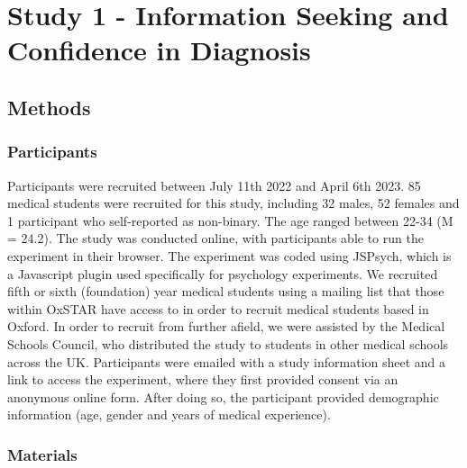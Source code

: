 \documentclass[a4paper, nobind]{templates/ociamthesis}
\begin{document}
\hypertarget{study-1---information-seeking-and-confidence-in-diagnosis}{%
\chapter*{Study 1 - Information Seeking and Confidence in Diagnosis}\label{study-1---information-seeking-and-confidence-in-diagnosis}}

\adjustmtc
{}

\hypertarget{methods}{%
\section*{Methods}\label{methods}}

\hypertarget{participants}{%
\subsection*{Participants}\label{participants}}

Participants were recruited between July 11th 2022 and April 6th 2023. 85 medical students were recruited for this study, including 32 males, 52 females and 1 participant who self-reported as non-binary. The age ranged between 22-34 (M = 24.2). The study was conducted online, with participants able to run the experiment in their browser. The experiment was coded using JSPsych, which is a Javascript plugin used specifically for psychology experiments. We recruited fifth or sixth (foundation) year medical students using a mailing list that those within OxSTAR have access to in order to recruit medical students based in Oxford. In order to recruit from further afield, we were assisted by the Medical Schools Council, who distributed the study to students in other medical schools across the UK. Participants were emailed with a study information sheet and a link to access the experiment, where they first provided consent via an anonymous online form. After doing so, the participant provided demographic information (age, gender and years of medical experience).

\hypertarget{materials}{%
\subsection*{Materials}\label{materials}}
\end{document}
